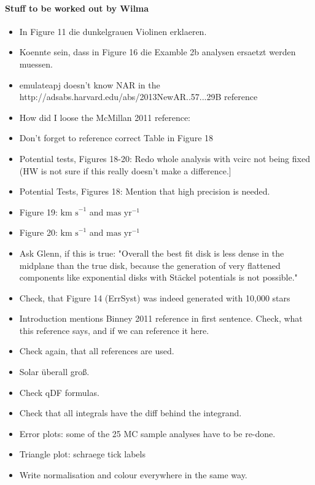\paragraph{Stuff to be worked out by Wilma}
\begin{itemize}
\item In Figure 11 die dunkelgrauen Violinen erklaeren.
\item Koennte sein, dass in Figure 16 die Examble 2b analysen ersaetzt werden muessen.
\item emulateapj doesn't know NAR in the http://adsabs.harvard.edu/abs/2013NewAR..57...29B reference
\item How did I loose the McMillan 2011 reference: %
\item Don't forget to reference correct Table in Figure 18
\item Potential tests, Figures 18-20: Redo whole analysis with vcirc not being fixed (HW is not sure if this really doesn't make a difference.]
\item Potential Tests, Figures 18: Mention that high precision is needed.
\item Figure 19: $\text{km s}^{-1}$ and $\text{mas yr}^{-1}$
\item Figure 20: $\text{km s}^{-1}$ and $\text{mas yr}^{-1}$
\item Ask Glenn, if this is true: "Overall the best fit disk is less dense in the midplane than the true disk, because the generation of very flattened components like exponential disks with St\"{a}ckel potentials is not possible."
\item Check, that Figure 14 (ErrSyst) was indeed generated with 10,000 stars
\item Introduction mentions Binney 2011 reference in first sentence. Check, what this reference says, and if we can reference it here.
\item Check again, that all references are used.
\item Solar überall groß.
\item Check qDF formulas.
\item Check that all integrals have the diff behind the integrand.
\item Error plots: some of the 25 MC sample analyses have to be re-done.
\item Triangle plot: schraege tick labels
\item Write normalisation and colour everywhere in the same way.

\end{itemize}
